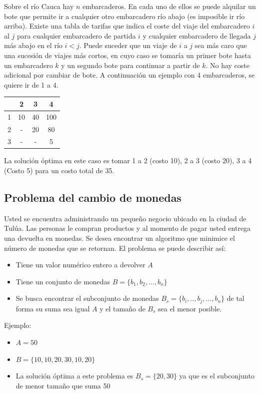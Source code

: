 \documentclass[10pt,twocolumn]{article}
\begin{document}
Sobre el río Cauca hay $n$ embarcaderos. En cada uno de ellos se puede alquilar un bote que permite ir a cualquier otro embarcadero río abajo (es imposible ir río arriba). Existe una tabla de tarifas que indica el coste del viaje del embarcadero $i$ al $j$ para cualquier embarcadero de partida $i$ y cualquier embarcadero de llegada $j$ más abajo en el río $i < j$. Puede suceder que un viaje de $i$ a $j$ sea más
caro que una sucesión de viajes más cortos, en cuyo caso se tomaría un primer bote hasta un embarcadero $k$ y un segundo bote para continuar a partir de $k$. No hay coste adicional por cambiar de bote. A continuación un ejemplo con 4 embarcaderos, se quiere ir de 1 a 4.
\begin{table}[h]
\centering
\begin{tabular}{|c|c|c|c|}
\hline
\textbf{} & \textbf{2}  & \textbf{3}  & \textbf{4}\\
\hline
1 & 10 & 40 & 100 \\
\hline
2 & - & 20 & 80 \\
\hline
3 & - & - & 5 \\
\hline
\end{tabular}
\end{table}

La solución óptima en este caso es tomar 1 a 2 (costo 10), 2 a 3 (costo 20), 3 a 4 (Costo 5) para un costo total de 35.

\subsection{Problema del cambio de monedas}

Usted se encuentra administrando un pequeño negocio ubicado en la ciudad de Tulúa. Las personas le compran productos y al momento de pagar usted entrega una devuelta en monedas. Se desea encontrar un algoritmo que minimice el número de monedas que se retornan. El problema se puede describir así:

\begin{itemize}
	\item Tiene un valor numérico entero a devolver $A$
	\item Tiene un conjunto de monedas $B = \{b_1,b_2,...,b_n\}$
	\item Se busca encontrar el subconjunto de monedas  $B_s= \{b_i,..,b_j,...,b_n\}$  de tal forma su suma sea igual $A$ y el tamaño de $B_s$ sea el menor posible.
\end{itemize}

Ejemplo:
\begin{itemize}
	\item $A = 50$
	\item $B = \{10, 10,20,30,10,20\}$
	\item La solución óptima a este problema es $B_s=\{20,30\}$ ya que es el subconjunto de menor tamaño que suma 50
\end{itemize}
\end{document}
